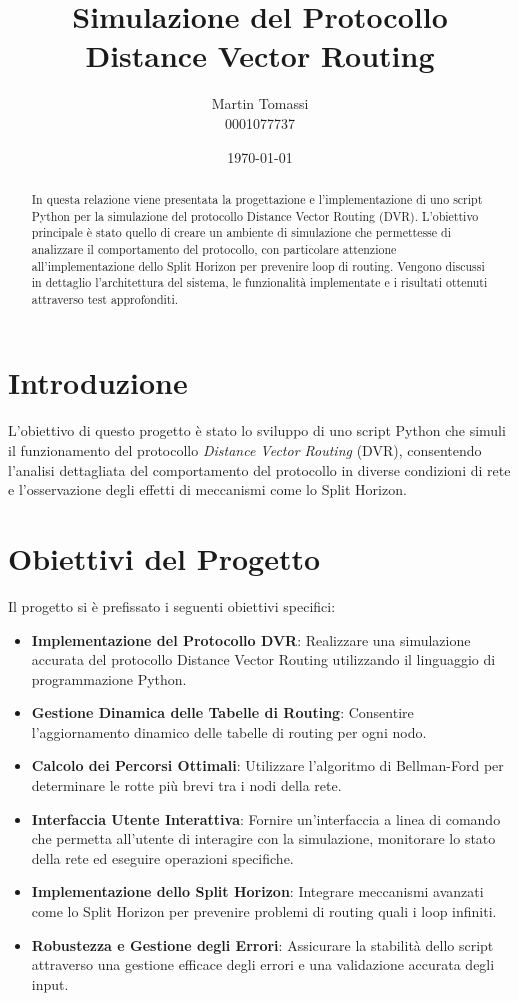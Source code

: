 \documentclass[a4paper,12pt]{article}
\title{\textbf{Simulazione del Protocollo Distance Vector Routing}}
\author{Martin Tomassi \\ 0001077737}
\date{\today}
\begin{document}
	
	\maketitle
	
	\begin{abstract}
		In questa relazione viene presentata la progettazione e l'implementazione di uno script Python per la simulazione del protocollo Distance Vector Routing (DVR). L'obiettivo principale è stato quello di creare un ambiente di simulazione che permettesse di analizzare il comportamento del protocollo, con particolare attenzione all'implementazione dello Split Horizon per prevenire loop di routing. Vengono discussi in dettaglio l'architettura del sistema, le funzionalità implementate e i risultati ottenuti attraverso test approfonditi.
	\end{abstract}
	
	\tableofcontents
	\newpage
	
	\section{Introduzione}
	
	L'obiettivo di questo progetto è stato lo sviluppo di uno script Python che simuli il funzionamento del protocollo \textit{Distance Vector Routing} (DVR), consentendo l'analisi dettagliata del comportamento del protocollo in diverse condizioni di rete e l'osservazione degli effetti di meccanismi come lo Split Horizon.
	
	\section{Obiettivi del Progetto}
	
	Il progetto si è prefissato i seguenti obiettivi specifici:
	
	\begin{itemize}
		\item \textbf{Implementazione del Protocollo DVR}: Realizzare una simulazione accurata del protocollo Distance Vector Routing utilizzando il linguaggio di programmazione Python.
		\item \textbf{Gestione Dinamica delle Tabelle di Routing}: Consentire l'aggiornamento dinamico delle tabelle di routing per ogni nodo.
		\item \textbf{Calcolo dei Percorsi Ottimali}: Utilizzare l'algoritmo di Bellman-Ford per determinare le rotte più brevi tra i nodi della rete.
		\item \textbf{Interfaccia Utente Interattiva}: Fornire un'interfaccia a linea di comando che permetta all'utente di interagire con la simulazione, monitorare lo stato della rete ed eseguire operazioni specifiche.
		\item \textbf{Implementazione dello Split Horizon}: Integrare meccanismi avanzati come lo Split Horizon per prevenire problemi di routing quali i loop infiniti.
		\item \textbf{Robustezza e Gestione degli Errori}: Assicurare la stabilità dello script attraverso una gestione efficace degli errori e una valida\-zione accurata degli input.
	\end{itemize}
	
\end{document}
